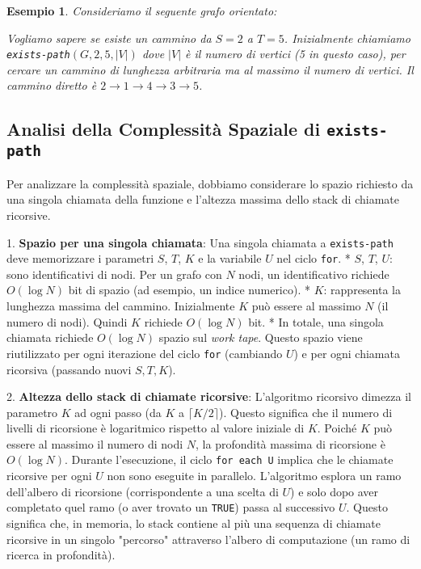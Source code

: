\documentclass[a4paper, 11pt]{book} %
\newtheorem{example}[theorem]{Esempio}
\theoremstyle{definition}
\begin{document}
\begin{example}
Consideriamo il seguente grafo orientato:
\begin{center}
\end{center}
Vogliamo sapere se esiste un cammino da $S=2$ a $T=5$. Inizialmente chiamiamo \texttt{exists-path}$(G, 2, 5, |V|)$ dove $|V|$ è il numero di vertici (5 in questo caso), per cercare un cammino di lunghezza arbitraria ma al massimo il numero di vertici.
Il cammino diretto è $2 \to 1 \to 4 \to 3 \to 5$.
\end{example}

\subsection{Analisi della Complessità Spaziale di \texttt{exists-path}}
Per analizzare la complessità spaziale, dobbiamo considerare lo spazio richiesto da una singola chiamata della funzione e l'altezza massima dello stack di chiamate ricorsive.

1.  \textbf{Spazio per una singola chiamata}:
    Una singola chiamata a \texttt{exists-path} deve memorizzare i parametri $S$, $T$, $K$ e la variabile $U$ nel ciclo \texttt{for}.
    *   $S$, $T$, $U$: sono identificativi di nodi. Per un grafo con $N$ nodi, un identificativo richiede $O(\log N)$ bit di spazio (ad esempio, un indice numerico).
    *   $K$: rappresenta la lunghezza massima del cammino. Inizialmente $K$ può essere al massimo $N$ (il numero di nodi). Quindi $K$ richiede $O(\log N)$ bit.
    *   In totale, una singola chiamata richiede $O(\log N)$ spazio sul \emph{work tape}. Questo spazio viene riutilizzato per ogni iterazione del ciclo \texttt{for} (cambiando $U$) e per ogni chiamata ricorsiva (passando nuovi $S, T, K$).

2.  \textbf{Altezza dello stack di chiamate ricorsive}:
    L'algoritmo ricorsivo dimezza il parametro $K$ ad ogni passo (da $K$ a $\lceil K/2 \rceil$). Questo significa che il numero di livelli di ricorsione è logaritmico rispetto al valore iniziale di $K$. Poiché $K$ può essere al massimo il numero di nodi $N$, la profondità massima di ricorsione è $O(\log N)$.
    Durante l'esecuzione, il ciclo \texttt{for each U} implica che le chiamate ricorsive per ogni $U$ non sono eseguite in parallelo. L'algoritmo esplora un ramo dell'albero di ricorsione (corrispondente a una scelta di $U$) e solo dopo aver completato quel ramo (o aver trovato un \texttt{TRUE}) passa al successivo $U$. Questo significa che, in memoria, lo stack contiene al più una sequenza di chiamate ricorsive in un singolo "percorso" attraverso l'albero di computazione (un ramo di ricerca in profondità).
\end{document}
